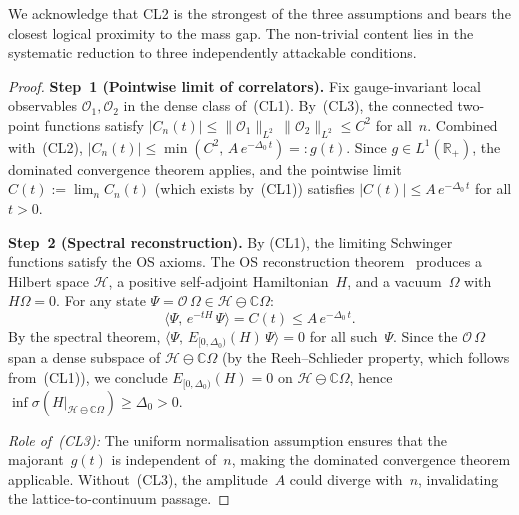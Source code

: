 \documentclass[12pt,a4paper]{article}
\theoremstyle{definition}
\theoremstyle{plain}
\theoremstyle{remark}
\begin{document}
We acknowledge that CL2 is the strongest of the three assumptions and bears the closest logical proximity to the mass gap. The non-trivial content lies in the systematic reduction to three independently attackable conditions.

\begin{proof}
\textbf{Step~1 (Pointwise limit of correlators).}
Fix gauge-invariant local observables $\mathcal{O}_1, \mathcal{O}_2$ in the
dense class of~(CL1). By~(CL3), the connected two-point functions satisfy
$|C_n(t)| \leq \|\mathcal{O}_1\|_{L^2}\,\|\mathcal{O}_2\|_{L^2} \leq C^2$
for all~$n$. Combined with~(CL2), $|C_n(t)| \leq \min(C^2,\,A\,e^{-\Delta_0\,t})
=: g(t)$. Since $g \in L^1(\mathbb{R}_+)$, the dominated convergence theorem
applies, and the pointwise limit $C(t) := \lim_n C_n(t)$ (which exists
by~(CL1)) satisfies $|C(t)| \leq A\,e^{-\Delta_0\,t}$ for all $t > 0$.

\textbf{Step~2 (Spectral reconstruction).}
By (CL1), the limiting Schwinger functions satisfy the OS axioms. The
OS reconstruction theorem~\cite{OsterwalderSchrader1973} produces a
Hilbert space $\mathcal{H}$, a positive self-adjoint Hamiltonian~$H$,
and a vacuum~$\Omega$ with $H\Omega = 0$. For any state
$\Psi = \mathcal{O}\,\Omega \in \mathcal{H} \ominus \mathbb{C}\Omega$:
\[
    \langle \Psi,\,e^{-tH}\,\Psi \rangle = C(t) \leq A\,e^{-\Delta_0\,t}.
\]
By the spectral theorem, $\langle \Psi,\,E_{[0,\Delta_0)}(H)\,\Psi \rangle = 0$
for all such~$\Psi$. Since the $\mathcal{O}\,\Omega$ span a dense subspace
of $\mathcal{H} \ominus \mathbb{C}\Omega$ (by the Reeh--Schlieder property,
which follows from~(CL1)), we conclude $E_{[0,\Delta_0)}(H) = 0$ on
$\mathcal{H} \ominus \mathbb{C}\Omega$, hence $\inf\sigma(H|_{\mathcal{H}
\ominus \mathbb{C}\Omega}) \geq \Delta_0 > 0$.

\emph{Role of~\textup{(CL3)}:} The uniform normalisation assumption ensures that the
majorant~$g(t)$ is independent of~$n$, making the dominated convergence
theorem applicable.  Without~(CL3), the amplitude~$A$ could diverge with~$n$,
invalidating the lattice-to-continuum passage.
\end{proof}
\end{document}
